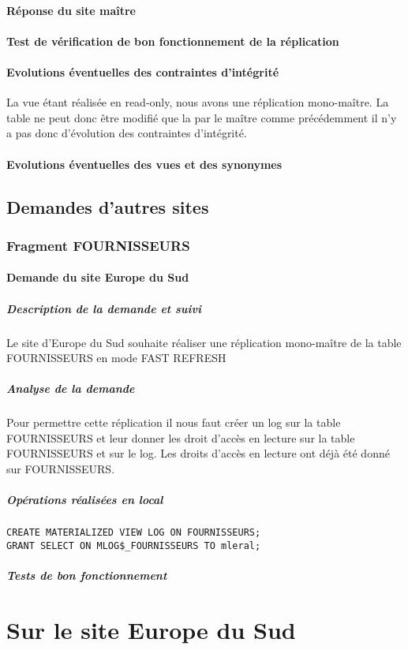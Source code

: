 \documentclass[10pt,a4paper,twoside]{article}
\begin{document}
\paragraph{Réponse du site maître}
\paragraph{Test de vérification de bon fonctionnement de la réplication}
\paragraph{Evolutions éventuelles des contraintes d'intégrité}
La vue étant réalisée en read-only, nous avons une réplication mono-maître. La table ne peut donc être modifié que la par le maître comme précédemment il n'y a pas donc d'évolution des contraintes d'intégrité.
\paragraph{Evolutions éventuelles des vues et des synonymes}
\subsection{Demandes d'autres sites}
\subsubsection{Fragment FOURNISSEURS}
\paragraph{Demande du site Europe du Sud}
\subparagraph{Description de la demande et suivi}
Le site d'Europe du Sud souhaite réaliser une réplication mono-maître de la table FOURNISSEURS en mode FAST REFRESH
\subparagraph{Analyse de la demande}
Pour permettre cette réplication il nous faut créer un log sur la table FOURNISSEURS et leur donner les droit d'accès en lecture sur la table FOURNISSEURS et sur le log. Les droits d'accès en lecture ont déjà été donné sur FOURNISSEURS.
\subparagraph{Opérations réalisées en local}
\begin{verbatim}
CREATE MATERIALIZED VIEW LOG ON FOURNISSEURS;
GRANT SELECT ON MLOG$_FOURNISSEURS TO mleral;
\end{verbatim}
\subparagraph{Tests de bon fonctionnement}

\section{Sur le site Europe du Sud}
\end{document}
